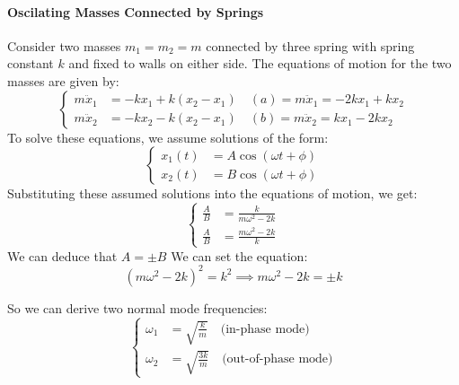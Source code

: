 \documentclass[11pt]{report}
\begin{document}
\paragraph{Oscilating Masses Connected by Springs} Consider two masses \( m_1 = m_2 = m \) connected by three spring with spring constant \( k \) and fixed to walls on either side. The equations of motion for the two masses are given by:
$$
    \begin{cases}
        m\ddot{x}_1 &= -k x_1 + k (x_2 - x_1) \quad (a) = m\ddot{x}_1 = -2k x_1 + k x_2 \\
        m\ddot{x}_2 &= -k x_2 - k (x_2 - x_1) \quad (b) = m\ddot{x}_2 = k x_1 - 2k x_2
    \end{cases}
$$
To solve these equations, we assume solutions of the form:
$$
    \begin{cases}
        x_1(t) &= A \cos(\omega t + \phi) \\
        x_2(t) &= B \cos(\omega t + \phi)
    \end{cases}
$$
Substituting these assumed solutions into the equations of motion, we get:
\begin{equation} \label{eq:coupled_springs}
    \begin{cases}
        \frac{A}{B} &= \frac{k}{m\omega^2 - 2k} \\
        \frac{A}{B} &= \frac{m\omega^2 - 2k}{k}
    \end{cases}
\end{equation}
We can deduce that $A = \pm B$  
We can set the equation:
$$
    (m\omega^2 - 2k)^2 = k^2 \implies m\omega^2 - 2k = \pm k
$$

So we can derive two normal mode frequencies:
$$
    \begin{cases}
        \omega_1 &= \sqrt{\frac{k}{m}} \quad \text{(in-phase mode)} \\
        \omega_2 &= \sqrt{\frac{3k}{m}} \quad \text{(out-of-phase mode)}
    \end{cases}
$$
\end{document}
